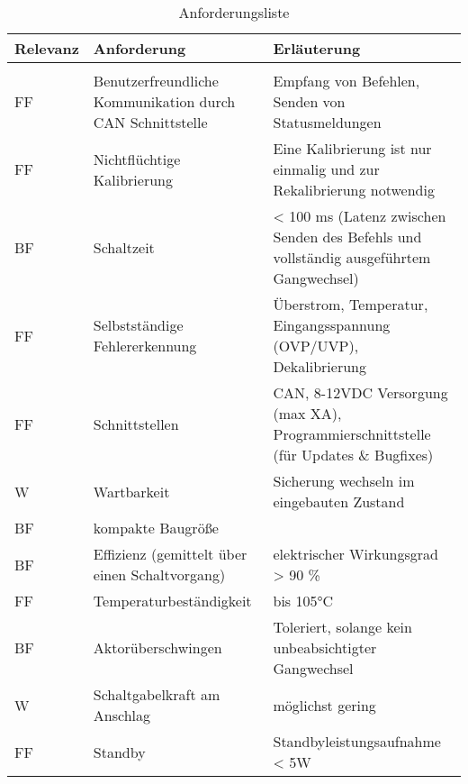 \begin{table}[h]
	\centering
		\begin{tabular}{l|p{7cm}|p{7cm}}
			\textbf{Relevanz} & \textbf{Anforderung} & \textbf{Erläuterung} \\ \hline
			& &\\
			FF & Benutzerfreundliche Kommunikation durch CAN Schnittstelle & Empfang von Befehlen, Senden von Statusmeldungen \\
			FF & Nichtflüchtige Kalibrierung & Eine Kalibrierung ist nur einmalig und zur Rekalibrierung notwendig \\
			BF & Schaltzeit & < 100 ms (Latenz zwischen Senden des Befehls und vollständig ausgeführtem Gangwechsel) \\
			FF & Selbstständige Fehlererkennung & Überstrom, Temperatur, Eingangsspannung (OVP/UVP), Dekalibrierung \\
			FF & Schnittstellen & CAN, 8-12VDC Versorgung (max XA), Programmierschnittstelle (für Updates \& Bugfixes) \\
			W & Wartbarkeit & Sicherung wechseln im eingebauten Zustand \\
			BF & kompakte Baugröße & \\ 
			BF & Effizienz (gemittelt über einen Schaltvorgang) & elektrischer Wirkungsgrad > 90 \% \\
			FF & Temperaturbeständigkeit & bis 105°C \\
			BF & Aktorüberschwingen & Toleriert, solange kein unbeabsichtigter Gangwechsel \\
			W & Schaltgabelkraft am Anschlag & möglichst gering \\
			FF & Standby & Standbyleistungsaufnahme < 5W \\
		\end{tabular}
	\caption{Anforderungsliste}
	\label{tab:Anforderungsliste}
\end{table}

